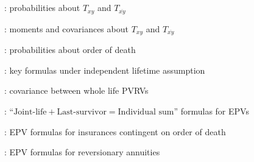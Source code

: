 \subsection*{}
\item {}: probabilities about \(T_{xy}\) and \(T_{\overline{xy}}\)
\item {}: moments and covariances about \(T_{xy}\) and \(T_{\overline{xy}}\)
\item {}: probabilities about order of death
\item {}: key formulas under independent lifetime assumption
\item {}: covariance between whole life PVRVs
\item {}: ``\(\text{Joint-life}+\text{Last-survivor}=\text{Individual sum}\)'' formulas for EPVs
\item {}: EPV formulas for insurances contingent on order of death
\item {}: EPV formulas for reversionary annuities
